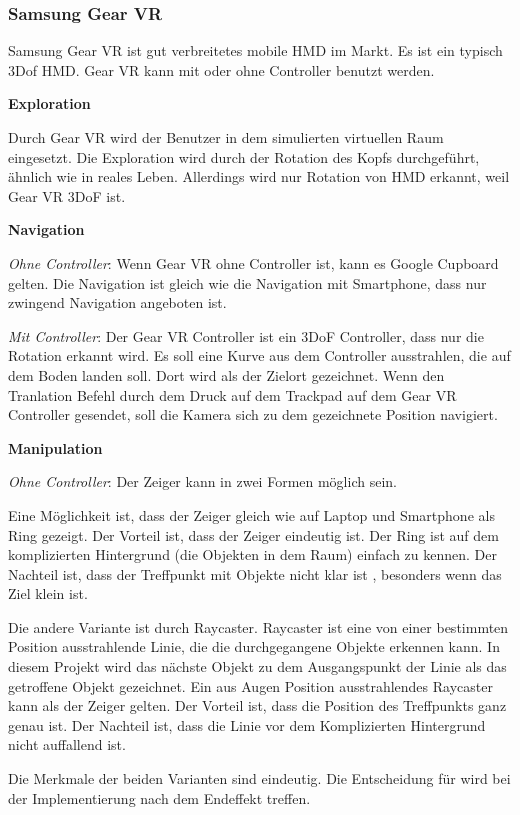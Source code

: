  \subsubsection{Samsung Gear VR}
 Samsung Gear VR ist gut verbreitetes mobile HMD im Markt. Es ist ein typisch 3Dof HMD. Gear VR kann mit oder ohne Controller benutzt werden.
 
  \textbf{Exploration}
  
  Durch Gear VR wird der Benutzer in dem simulierten virtuellen Raum eingesetzt. Die Exploration wird durch der Rotation des Kopfs durchgeführt, ähnlich wie in reales Leben. Allerdings wird nur Rotation von HMD erkannt, weil Gear VR 3DoF ist.
  
  \textbf{Navigation}
  
  \textsl{Ohne Controller}: Wenn Gear VR ohne Controller ist, kann es Google Cupboard gelten. Die Navigation ist gleich wie die Navigation mit Smartphone, dass nur zwingend Navigation angeboten ist.
 
  \textsl{Mit Controller}: Der Gear VR Controller ist ein 3DoF Controller, dass nur die Rotation erkannt wird. Es soll eine Kurve aus dem Controller ausstrahlen, die auf dem Boden landen soll. Dort wird als der Zielort gezeichnet. Wenn den Tranlation Befehl durch dem Druck auf dem Trackpad auf dem Gear VR Controller gesendet, soll die Kamera sich zu dem gezeichnete Position navigiert.

  \textbf{Manipulation}
  
  \textsl{Ohne Controller}: Der Zeiger kann in zwei Formen möglich sein.
  
  Eine Möglichkeit ist, dass der Zeiger gleich wie auf Laptop und Smartphone als Ring gezeigt. Der Vorteil ist, dass der Zeiger eindeutig ist. Der Ring ist auf dem komplizierten Hintergrund (die Objekten in dem Raum) einfach zu kennen. Der Nachteil ist, dass der Treffpunkt mit Objekte nicht klar ist , besonders wenn das Ziel klein ist.
  
  Die andere Variante ist durch Raycaster. Raycaster ist eine von einer bestimmten Position ausstrahlende Linie, die die durchgegangene Objekte erkennen kann. In diesem Projekt wird das nächste Objekt zu dem Ausgangspunkt der Linie als das getroffene Objekt gezeichnet. Ein aus Augen Position ausstrahlendes Raycaster kann als der Zeiger gelten. Der Vorteil ist, dass die Position des Treffpunkts ganz genau ist. Der Nachteil ist, dass die Linie vor dem Komplizierten Hintergrund nicht auffallend ist.
  
  Die Merkmale der beiden Varianten sind eindeutig. Die Entscheidung für wird bei der Implementierung nach dem Endeffekt treffen.
  
